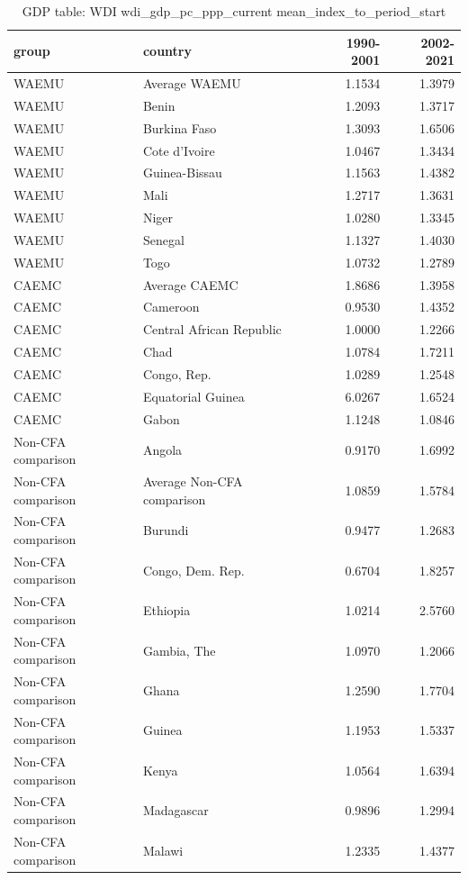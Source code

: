\begin{table}

\caption{GDP table: WDI wdi_gdp_pc_ppp_current mean_index_to_period_start}
\centering
\begin{tabular}[t]{llrr}
\toprule
group & country & 1990-2001 & 2002-2021\\
\midrule
WAEMU & Average WAEMU & 1.1534 & 1.3979\\
WAEMU & Benin & 1.2093 & 1.3717\\
WAEMU & Burkina Faso & 1.3093 & 1.6506\\
WAEMU & Cote d'Ivoire & 1.0467 & 1.3434\\
WAEMU & Guinea-Bissau & 1.1563 & 1.4382\\
\addlinespace
WAEMU & Mali & 1.2717 & 1.3631\\
WAEMU & Niger & 1.0280 & 1.3345\\
WAEMU & Senegal & 1.1327 & 1.4030\\
WAEMU & Togo & 1.0732 & 1.2789\\
CAEMC & Average CAEMC & 1.8686 & 1.3958\\
\addlinespace
CAEMC & Cameroon & 0.9530 & 1.4352\\
CAEMC & Central African Republic & 1.0000 & 1.2266\\
CAEMC & Chad & 1.0784 & 1.7211\\
CAEMC & Congo, Rep. & 1.0289 & 1.2548\\
CAEMC & Equatorial Guinea & 6.0267 & 1.6524\\
\addlinespace
CAEMC & Gabon & 1.1248 & 1.0846\\
Non-CFA comparison & Angola & 0.9170 & 1.6992\\
Non-CFA comparison & Average Non-CFA comparison & 1.0859 & 1.5784\\
Non-CFA comparison & Burundi & 0.9477 & 1.2683\\
Non-CFA comparison & Congo, Dem. Rep. & 0.6704 & 1.8257\\
\addlinespace
Non-CFA comparison & Ethiopia & 1.0214 & 2.5760\\
Non-CFA comparison & Gambia, The & 1.0970 & 1.2066\\
Non-CFA comparison & Ghana & 1.2590 & 1.7704\\
Non-CFA comparison & Guinea & 1.1953 & 1.5337\\
Non-CFA comparison & Kenya & 1.0564 & 1.6394\\
\addlinespace
Non-CFA comparison & Madagascar & 0.9896 & 1.2994\\
Non-CFA comparison & Malawi & 1.2335 & 1.4377\\

\end{tabular}
\end{table}
